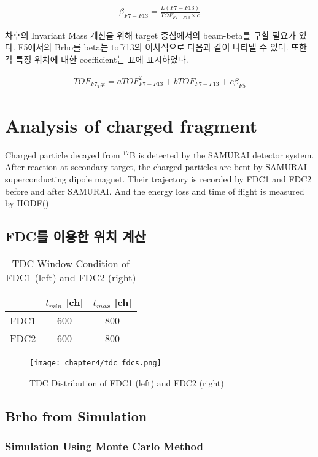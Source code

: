 \begin{align}
    \beta_{F7-F13} = \frac{L(F7-F13)}{TOF_{F7-F13} \times c}
\end{align}

차후의 Invariant Mass 계산을 위해 target 중심에서의 beam-beta를 구할 필요가 있다. F5에서의 Brho를  beta는 tof713의 이차식으로 다음과 같이 나타낼 수 있다. 또한 각 특정 위치에 대한 coefficient는 표에 표시하였다.

\begin{align}
    TOF_{F7_Tgt} = a TOF_{F7-F13}^{2} + b TOF_{F7-F13} + c    \beta_{F5}  
\end{align}

\clearpage

\section{Analysis of charged fragment}
Charged particle decayed from ${}^{17}$B is detected by the SAMURAI detector system. After reaction at secondary target, the charged particles are bent by SAMURAI superconducting dipole magnet. Their trajectory is recorded by FDC1 and FDC2 before and after SAMURAI. And the energy loss and time of flight is measured by HODF()

\subsection{FDC를 이용한 위치 계산}
\begin{table}
    \centering
    \begin{tabular}[h]{c|cc}
        \hline
        &$t_{min}$ [ch]&$t_{max}$ [ch]\\
        \hline
        FDC1&600&800\\
        FDC2&600&800\\        
        \hline
    \end{tabular}
    \caption[TDC Window Condition of FDCs]{TDC Window Condition of FDC1 (left) and FDC2 (right)}
\end{table}
\begin{figure}
    \centering
    \texttt{[image: chapter4/tdc\_fdcs.png]}
    \caption[TDC Distribution of FDCs]{TDC Distribution of FDC1 (left) and FDC2 (right)}
\end{figure}
\subsection{Brho from Simulation}
\subsubsection{Simulation Using Monte Carlo Method}

